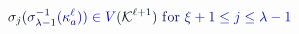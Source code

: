 \documentclass[12pt]{article}
\begin{document}
\makeatletter
\renewcommand*{\@textcolor}[3]{%
  \protect\leavevmode
  \begingroup
    \color#1{#2}#3%
  \endgroup
}
\makeatother
\begin{displaymath}
\mathcolor[RGB]{0,0,15}{\sigma} _ { \mathcolor[RGB]{0,0,30}{j} } \mathcolor[RGB]{0,0,45}{(} \mathcolor[RGB]{0,0,60}{\sigma} _ { \mathcolor[RGB]{0,0,75}{\lambda} \mathcolor[RGB]{0,0,90}{-} \mathcolor[RGB]{0,0,105}{1} } ^ { \mathcolor[RGB]{0,0,120}{-} \mathcolor[RGB]{0,0,135}{1} } \mathcolor[RGB]{0,0,150}{(} \mathcolor[RGB]{0,0,165}{\kappa} _ { \mathcolor[RGB]{0,0,180}{a} } ^ { \mathcolor[RGB]{0,0,195}{\ell} } \mathcolor[RGB]{0,0,210}{)} \mathcolor[RGB]{0,0,225}{)} \mathcolor[RGB]{0,0,240}{\in} \mathcolor[RGB]{0,0,255}{V} \mathcolor[RGB]{0,15,0}{(} \mathcal { \mathcolor[RGB]{0,15,15}{K} } ^ { \mathcolor[RGB]{0,15,30}{\ell} \mathcolor[RGB]{0,15,45}{+} \mathcolor[RGB]{0,15,60}{1} } \mathcolor[RGB]{0,15,75}{)} \mathrm { ~ \mathcolor[RGB]{0,15,90}{f} \mathcolor[RGB]{0,15,105}{o} \mathcolor[RGB]{0,15,120}{r} ~ } \mathcolor[RGB]{0,15,135}{\xi} \mathcolor[RGB]{0,15,150}{+} \mathcolor[RGB]{0,15,165}{1} \mathcolor[RGB]{0,15,180}{\leq} \mathcolor[RGB]{0,15,195}{j} \mathcolor[RGB]{0,15,210}{\leq} \mathcolor[RGB]{0,15,225}{\lambda} \mathcolor[RGB]{0,15,240}{-} \mathcolor[RGB]{0,15,255}{1}
\end{displaymath}
\end{document}
